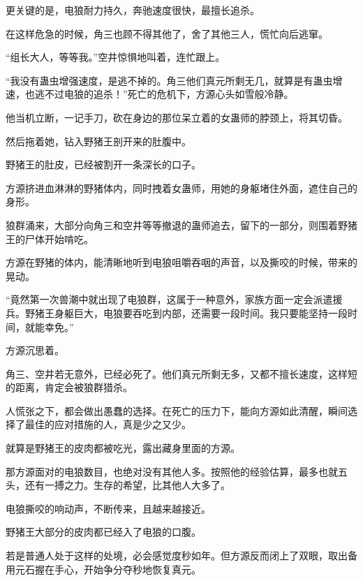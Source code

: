\begin{this_body}
更关键的是，电狼耐力持久，奔驰速度很快，最擅长追杀。

在这样危急的时候，角三也顾不得其他了，舍了其他三人，慌忙向后逃窜。

“组长大人，等等我。”空井惊惧地叫着，连忙跟上。

“我没有蛊虫增强速度，是逃不掉的。角三他们真元所剩无几，就算是有蛊虫增速，也逃不过电狼的追杀！”死亡的危机下，方源心头如雪般冷静。

他当机立断，一记手刀，砍在身边的那位呆立着的女蛊师的脖颈上，将其切昏。

然后拖着她，钻入野猪王剖开来的肚腹中。

野猪王的肚皮，已经被割开一条深长的口子。

方源挤进血淋淋的野猪体内，同时拽着女蛊师，用她的身躯堵住外面，遮住自己的身形。

狼群涌来，大部分向角三和空井等等撤退的蛊师追去，留下的一部分，则围着野猪王的尸体开始啃吃。

方源在野猪的体内，能清晰地听到电狼咀嚼吞咽的声音，以及撕咬的时候，带来的晃动。

“竟然第一次兽潮中就出现了电狼群，这属于一种意外，家族方面一定会派遣援兵。野猪王身躯巨大，电狼要吞吃到内部，还需要一段时间。我只要能坚持一段时间，就能幸免。”

方源沉思着。

角三、空井若无意外，已经必死了。他们真元所剩无多，又都不擅长速度，这样短的距离，肯定会被狼群猎杀。

人慌张之下，都会做出愚蠢的选择。在死亡的压力下，能向方源如此清醒，瞬间选择了最佳的应对措施的人，真是少之又少。

就算是野猪王的皮肉都被吃光，露出藏身里面的方源。

那方源面对的电狼数目，也绝对没有其他人多。按照他的经验估算，最多也就五头，还有一搏之力。生存的希望，比其他人大多了。

电狼撕咬的响动声，不断传来，且越来越接近。

野猪王大部分的皮肉都已经入了电狼的口腹。

若是普通人处于这样的处境，必会感觉度秒如年。但方源反而闭上了双眼，取出备用元石握在手心，开始争分夺秒地恢复真元。

\end{this_body}

